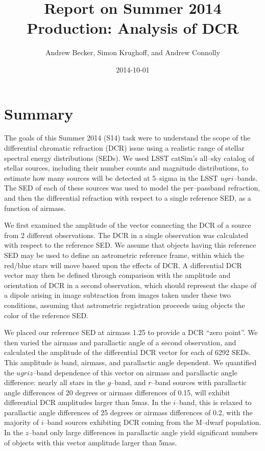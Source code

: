 \documentclass[DM,toc]{lsstdoc}
\title{Report on Summer 2014 Production: Analysis of DCR}
\author{Andrew Becker, Simon Krughoff, and Andrew Connolly}
\date{2014-10-01}
\begin{document}
\maketitle


\section{Summary}

The goals of this Summer 2014 (S14) task were to understand the scope
of the differential chromatic refraction (DCR) issue using a realistic
range of stellar spectral energy distributions (SEDs).  We used LSST
catSim's all--sky catalog of stellar sources, including their number
counts and magnitude distributions, to estimate how many sources will
be detected at 5--sigma in the LSST $ugri$--bands.  The SED of each of
these sources was used to model the per--passband refraction, and then
the differential refraction with respect to a single reference SED, as
a function of airmass.

We first examined the amplitude of the vector connecting the DCR of a
source from 2 different observations.  The DCR in a single observation
was calculated with respect to the reference SED.  We assume that
objects having this reference SED may be used to define an astrometric
reference frame, within which the red/blue stars will move based upon
the effects of DCR.  A differential DCR vector may then be defined
through comparison with the amplitude and orientation of DCR in a
second observation, which should represent the shape of a dipole
arising in image subtraction from images taken under these two
conditions, assuming that astrometric registration proceeds using
objects the color of the reference SED.

We placed our reference SED at airmass 1.25 to provide a DCR ``zero
point''.  We then varied the airmass and parallactic angle of a second
observation, and calculated the amplitude of the differential DCR
vector for each of 6292 SEDs.  This amplitude is band, airmass, and
parallactic angle dependent.  We quantified the $ugriz$--band
dependence of this vector on airmass and parallactic angle difference:
nearly all stars in the $g$--band, and $r$--band sources with
parallactic angle differences of 20 degrees or airmass differences of
0.15, will exhibit differential DCR amplitudes larger than 5mas.  In
the $i$--band, this is relaxed to parallactic angle differences of 25
degrees or airmass differences of 0.2, with the majority of $i$--band
sources exhibiting DCR coming from the M--dwarf population.  In the
$z$--band only large differences in parallactic angle yield
significant numbers of objects with this vector amplitude larger than
5mas.
\end{document}
